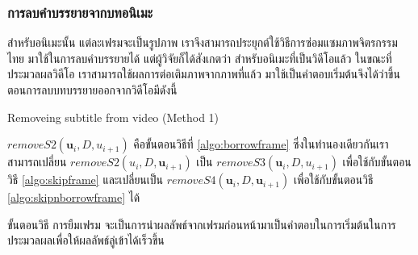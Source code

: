 \documentclass[hidelinks, a4paper,12pt]{article}
\numberwithin{equation}{section}							%
\numberwithin{equation}{section}
\begin{document}
{	\subsubsection{การลบคำบรรยายจากบทอนิเมะ}
	\hspace{1cm} สำหรับอนิเมะนั้น แต่ละเฟรมจะเป็นรูปภาพ เราจึงสามารถประยุกต์ใช้วิธีการซ่อมแซมภาพจิตรกรรมไทย มาใช้ในการลบคำบรรยายได้ แต่ผู้วิจัยก็ได้สังเกตว่า สำหรับอนิเมะที่เป็นวิดีโอแล้ว ในขณะที่ประมวลผลวิดีโอ เราสามารถใช้ผลการต่อเติมภาพจากภาพที่แล้ว มาใช้เป็นคำตอบเริ่มต้นจึงได้ว่าขึ้นตอนการลบบทบรรยายออกจากวิดีโอมีดังนี้\\
	
			\vspace{0.5cm}
	
	\begin{algorithm}[H]
		\SetAlgoNoLine
		\caption{Removeing subtitle from video (Method 1)}
	\end{algorithm}
	\vspace{0.5cm}
	\hspace{1cm}  $removeS2(\boldsymbol{u}_{i},D,u_{i+1})$  คือขั้นตอนวิธีที่ \ref{algo:borrowframe} ซึ่งในทำนองเดียวกันเราสามารถเปลี่ยน $removeS2(u_{i},D,\boldsymbol{u}_{i+1})$ เป็น $removeS3(\boldsymbol{u}_{i},D,u_{i+1})$ เพื่อใช้กับขั้นตอนวิธี \ref{algo:skipframe} และเปลี่ยนเป็น  $removeS4(\boldsymbol{u}_{i},D,\boldsymbol{u}_{i+1})$ เพื่อใช้กับขั้นตอนวิธี \ref{algo:skipnborrowframe} ได้ \\
	
	\vspace{0.5cm}
	
	\hspace{1cm} ขั้นตอนวิธี การยืมเฟรม จะเป็นการนำผลลัพธ์จากเฟรมก่อนหน้ามาเป็นคำตอบในการเริ่มต้นในการประมวลผลเพื่อให้ผลลัพธ์ลู่เข้าได้เร็วขึ้น \\
	
		\vspace{0.5cm}
	
}
\end{document}
